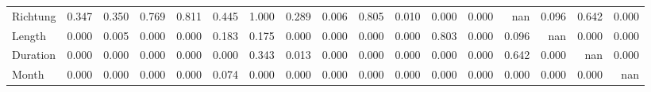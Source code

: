 \begin{tabular}{lrrrrrrrrrrrrrrrr}
Richtung & 0.347 & 0.350 & 0.769 & 0.811 &  0.445 &  1.000 & 0.289 &  0.006 &  0.805 & 0.010 & 0.000 &   0.000 &       nan &   0.096 &     0.642 &  0.000 \\
Length   & 0.000 & 0.005 & 0.000 & 0.000 &  0.183 &  0.175 & 0.000 &  0.000 &  0.000 & 0.000 & 0.803 &   0.000 &     0.096 &     nan &     0.000 &  0.000 \\
Duration & 0.000 & 0.000 & 0.000 & 0.000 &  0.000 &  0.343 & 0.013 &  0.000 &  0.000 & 0.000 & 0.000 &   0.000 &     0.642 &   0.000 &       nan &  0.000 \\
Month    & 0.000 & 0.000 & 0.000 & 0.000 &  0.074 &  0.000 & 0.000 &  0.000 &  0.000 & 0.000 & 0.000 &   0.000 &     0.000 &   0.000 &     0.000 &    nan \\
\bottomrule
\end{tabular}
